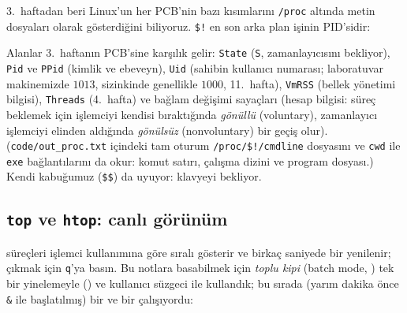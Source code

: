 3.~haftadan beri Linux'un her PCB'nin bazı kısımlarını \texttt{/proc} altında metin dosyaları olarak gösterdiğini biliyoruz. \verb|$!| en son arka plan işinin PID'sidir:



Alanlar 3.~haftanın PCB'sine karşılık gelir: \texttt{State} (\texttt{S}, zamanlayıcısını bekliyor), \texttt{Pid} ve \texttt{PPid} (kimlik ve ebeveyn), \texttt{Uid} (sahibin kullanıcı numarası; laboratuvar makinemizde $1013$, sizinkinde genellikle $1000$, 11.~hafta), \texttt{VmRSS} (bellek yönetimi bilgisi), \texttt{Threads} (4.~hafta) ve bağlam değişimi sayaçları (hesap bilgisi: süreç beklemek için işlemciyi kendisi bıraktığında \emph{gönüllü} (voluntary), zamanlayıcı işlemciyi elinden aldığında \emph{gönülsüz} (nonvoluntary) bir geçiş olur). (\texttt{code/out\_proc.txt} içindeki tam oturum \texttt{/proc/\$!/cmdline} dosyasını ve \texttt{cwd} ile \texttt{exe} bağlantılarını da okur: komut satırı, çalışma dizini ve program dosyası.) Kendi kabuğumuz (\verb|$$|) da uyuyor: klavyeyi bekliyor.

\subsection{\texttt{top} ve \texttt{htop}: canlı görünüm}
\label{sec:top}

 süreçleri işlemci kullanımına göre sıralı gösterir ve birkaç saniyede bir yenilenir; çıkmak için \texttt{q}'ya basın. Bu notlara basabilmek için \emph{toplu kipi} (batch mode, ) tek bir yinelemeyle () ve kullanıcı süzgeci  ile kullandık; bu sırada (yarım dakika önce \texttt{\&} ile başlatılmış) bir  ve bir  çalışıyordu:



